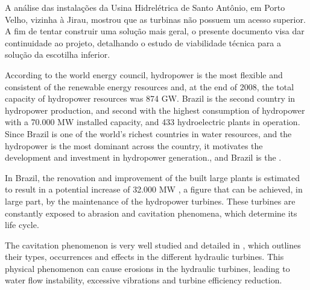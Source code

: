 A análise das instalações da Usina Hidrelétrica de Santo Antônio, em Porto
Velho, vizinha à Jirau, mostrou que as turbinas não possuem um acesso superior.
A fim de tentar construir uma solução mais geral, o presente documento visa dar
continuidade ao projeto, detalhando o estudo de viabilidade técnica para a
solução da escotilha inferior.

According to the world energy council, hydropower is the most flexible and
consistent of the renewable energy resources and, at the end of 2008, the total
capacity of hydropower resources was 874 GW. Brazil is the second
country in hydropower production, and second with the highest
consumption of hydropower with a 70.000 MW installed capacity, and 433
hydroelectric plants in operation. Since Brazil is one of the world's richest
countries in water resources, and the hydropower is the most dominant across
the country, it motivates the development and investment in hydropower
generation., and Brazil is the .


In Brazil, the renovation and improvement of the built large plants is estimated
to result in a potential increase of 32.000 MW \citep{goldemberg2007energia}, a
figure that can be achieved, in large part, by the maintenance of the
hydropower turbines. These turbines are constantly exposed to abrasion and
cavitation phenomena, which determine its life cycle.

The cavitation phenomenon is very well studied and detailed in
\cite{escaler2006detection}, which outlines their types, occurrences and
effects in the different hydraulic turbines. This physical phenomenon can cause
erosions in the hydraulic turbines, leading to water flow instability,
excessive vibrations and turbine efficiency reduction.

